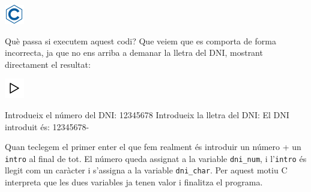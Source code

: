 \documentclass[]{book}
\newenvironment{Shaded}{\begin{snugshade}}{\end{snugshade}}
\newcommand{\DataTypeTok}[1]{\textcolor[rgb]{0.13,0.29,0.53}{#1}}
\newcommand{\DecValTok}[1]{\textcolor[rgb]{0.00,0.00,0.81}{#1}}
\newcommand{\SpecialCharTok}[1]{\textcolor[rgb]{0.00,0.00,0.00}{#1}}
\newcommand{\StringTok}[1]{\textcolor[rgb]{0.31,0.60,0.02}{#1}}
\newcommand{\ImportTok}[1]{#1}
\newcommand{\CommentTok}[1]{\textcolor[rgb]{0.56,0.35,0.01}{\textit{#1}}}
\newcommand{\ControlFlowTok}[1]{\textcolor[rgb]{0.13,0.29,0.53}{\textbf{#1}}}
\newcommand{\PreprocessorTok}[1]{\textcolor[rgb]{0.56,0.35,0.01}{\textit{#1}}}
\newcommand{\NormalTok}[1]{#1}
\begin{document}
\includegraphics{./img/c.png}

\begin{Shaded}
\end{Shaded}

Què passa si executem aquest codi? Que veiem que es comporta de forma
incorrecta, ja que no ens arriba a demanar la lletra del DNI, mostrant
directament el resultat:

\includegraphics{./img/play.png}

\begin{Shaded}
\begin{Highlighting}[]
\NormalTok{Introdueix el número del DNI: }\DecValTok{12345678}
\NormalTok{Introdueix la lletra del DNI:}
\NormalTok{El DNI introduit és: }\DecValTok{12345678}\NormalTok{-}
\end{Highlighting}
\end{Shaded}

Quan teclegem el primer enter el que fem realment és introduir un número
+ un \texttt{intro} al final de tot. El número queda assignat a la
variable \texttt{dni\_num}, i l'\texttt{intro} és llegit com un caràcter
i s'assigna a la variable \texttt{dni\_char}. Per aquest motiu C
interpreta que les dues variables ja tenen valor i finalitza el
programa.
\end{document}
